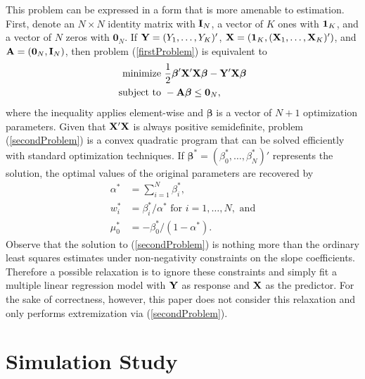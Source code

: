 \documentclass[11pt]{article}
\theoremstyle{definition}
\theoremstyle{definition}
\def\one{{\bf 1}}
\def\A{{\bf A}}
\def\X{{\bf X}}
\def\Y{{\bf Y}}
\def\Beta{\boldsymbol{\beta}}
\def\I{{\bf I}}
\begin{document}
This problem can be expressed in a form that is more amenable to estimation. First, denote an $N \times N$ identity matrix with $\I_N$,  a vector of $K$ ones with $\one_K$, and a vector of $N$ zeros with $\boldsymbol{0}_N$. If $\Y = (Y_1, \dots, Y_K)'$, $\X = (\one_K, (\X_1, \dots, \X_K)')$, and $\A = (\boldsymbol{0}_N, \I_N)$, then  problem (\ref{firstProblem}) is equivalent to
\begin{align}
 \label{secondProblem}
 \begin{split}
\text{minimize } & \frac{1}{2} \Beta' \X'\X \Beta - \Y'\X\Beta\\
\text{subject to } & -\A\Beta \leq \boldsymbol{0}_N,
\end{split}
\end{align}
where the inequality applies element-wise and $\Beta$ is a vector of $N+1$ optimization parameters. Given that $\X'\X$ is always positive semidefinite, problem (\ref{secondProblem}) is a convex quadratic program that can be solved efficiently with standard optimization techniques. If $\Beta^* = (\beta_0^*, \dots, \beta_{N}^*)'$ represents the solution, the optimal values of the original parameters are recovered by
\begin{align*}
\alpha^* &= \sum_{i=1}^N \beta_i^*,\\
w_i^* &=  \beta_i^*/\alpha^* \text{ for } i = 1, \dots, N, \text{ and}\\
\mu_0^* &= -\beta_0^*/(1-\alpha^*).
\end{align*}
Observe that the solution to (\ref{secondProblem}) is nothing more than the ordinary least squares estimates under non-negativity constraints on the slope coefficients. Therefore a possible relaxation is to ignore these constraints and simply fit a multiple linear regression model with $\Y$ as response and $\X$ as the predictor. For the sake of correctness, however, this paper does not consider this relaxation and only performs extremization via (\ref{secondProblem}). 



\section{Simulation Study} \label{simulation}
\end{document}
